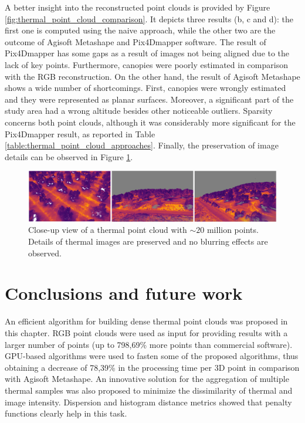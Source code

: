 A better insight into the reconstructed point clouds is provided by Figure \ref{fig:thermal_point_cloud_comparison}. It depicts three results (b, c and d): the first one is computed using the naive approach, while the other two are the outcome of Agisoft Metashape and Pix4Dmapper software. The result of Pix4Dmapper has some gaps as a result of images not being aligned due to the lack of key points. Furthermore, canopies were poorly estimated in comparison with the RGB reconstruction. On the other hand, the result of Agisoft Metashape shows a wide number of shortcomings. First, canopies were wrongly estimated and they were represented as planar surfaces. Moreover, a significant part of the study area had a wrong altitude besides other noticeable outliers. Sparsity concerns both point clouds, although it was considerably more significant for the Pix4Dmapper result, as reported in Table \ref{table:thermal_point_cloud_approaches}. Finally, the preservation of image details can be observed in Figure \ref{fig:thermal_zoomed_up}.

\begin{figure}[hbt]
	\centering
    \includegraphics[width=\linewidth]{figs/thermal_projection/thermal_close_view.png}
	\caption{Close-up view of a thermal point cloud with $\sim20$ million points. Details of thermal images are preserved and no blurring effects are observed.}
	\label{fig:thermal_zoomed_up}
\end{figure}

\section{Conclusions and future work}
\label{Conclusions and future work}

An efficient algorithm for building dense thermal point clouds was proposed in this chapter. RGB point clouds were used as input for providing results with a larger number of points (up to 798,69\% more points than commercial software). GPU-based algorithms were used to fasten some of the proposed algorithms, thus obtaining a decrease of 78,39\% in the processing time per 3D point in comparison with Agisoft Metashape. An innovative solution for the aggregation of multiple thermal samples was also proposed to minimize the dissimilarity of thermal and image intensity. Dispersion and histogram distance metrics showed that penalty functions clearly help in this task.

